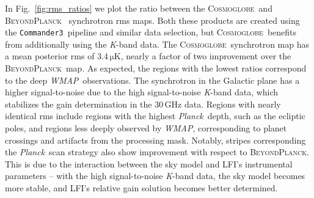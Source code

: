 \documentclass[twocolumn]{../../common/aa}
\def\WMAP{\emph{WMAP}}
\def\Planck{\emph{Planck}}
\def\commanderthree{\texttt{Commander3}}
\newcommand{\bp}{\textsc{BeyondPlanck}}
\newcommand{\cosmoglobe}{\textsc{Cosmoglobe}}
\newcommand{\K}[0]{\textit K}
\begin{document}
In Fig.~\ref{fig:rms_ratios} we plot the ratio between the \cosmoglobe\ and \bp\ \citep{bp01} synchrotron rms maps. Both these products are created using the \commanderthree\ pipeline and similar data selection, but \cosmoglobe\ benefits from additionally using the \K-band data. The \cosmoglobe\ synchrotron map has a mean posterior rms of $3.4\,\mathrm{\mu K}$, nearly a factor of two improvement over the \bp\ map.
As expected, the regions with the lowest ratios correspond to the deep \WMAP\ observations. The synchrotron in the Galactic plane has a higher signal-to-noise due to the high signal-to-noise \K-band data, which stabilizes the gain determination in the 30\,GHz data. Regions with nearly identical rms include regions with the highest \Planck\ depth, such as the ecliptic poles, and regions less deeply observed by \WMAP, corresponding to planet crossings and artifacts from the processing mask. Notably, stripes corresponding the \Planck\ scan strategy also show improvement with respect to \bp. This is due to the interaction between the sky model and LFI's instrumental parameters -- with the high signal-to-noise \K-band data, the sky model becomes more stable, and LFI's relative gain solution becomes better determined.
\end{document}
